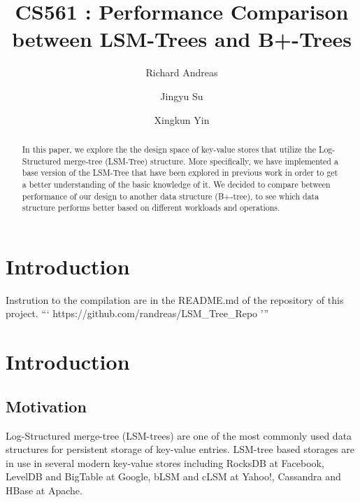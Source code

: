 \documentclass[sigconf]{acmart}
\begin{document}
    \title{CS561 : Performance Comparison between LSM-Trees and B+-Trees}

    \author{Richard Andreas}
    \author{Jingyu Su}
    \author{Xingkun Yin}

    \begin{abstract}
        In this paper, we explore the the design space of key-value stores that utilize the Log-Structured merge-tree (LSM-Tree) structure. More specifically, we have implemented a base version of the LSM-Tree that have been explored in previous work in order to get a better understanding of the basic knowledge of it. We decided to compare between performance of our design to another data structure (B+-tree), to see which data structure performs better based on different workloads and operations.
    \end{abstract}

    \maketitle

\section{Introduction}
    Instrution to the compilation are in the README.md of the repository of this project.
    ```
    https://github.com/randreas/LSM_Tree_Repo
    '''

    \section{Introduction}

    \subsection{Motivation}


    Log-Structured merge-tree (LSM-trees) are one of the most commonly used data structures for persistent storage of key-value entries. LSM-tree based storages are in use in several modern key-value stores including RocksDB at
    Facebook, LevelDB and BigTable at Google, bLSM and cLSM at Yahoo!, Cassandra
    and HBase at Apache.
\end{document}
